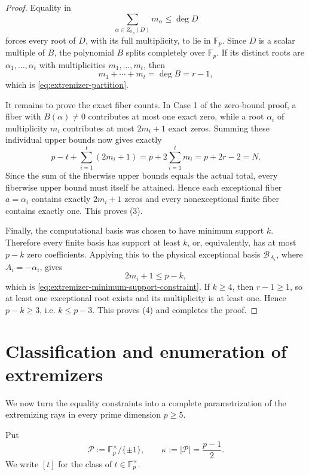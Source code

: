 \documentclass[11pt]{article}
\newcommand{\F}{\mathbb F}
\begin{document}
\begin{proof}
Equality in
\[
 \sum_{\alpha\in Z_{\F_p}(D)}m_\alpha\le\deg D
\]
forces every root of \(D\), with its full multiplicity, to lie in
\(\F_p\).  Since \(D\) is a scalar multiple of \(B\), the polynomial
\(B\) splits completely over \(\F_p\).  If its distinct roots are
\(\alpha_1,\ldots,\alpha_t\) with multiplicities
\(m_1,\ldots,m_t\), then
\[
 m_1+\cdots+m_t=\deg B=r-1,
\]
which is \eqref{eq:extremizer-partition}.

It remains to prove the exact fiber counts.  In Case 1 of the zero-bound
proof, a fiber with \(B(\alpha)\ne0\) contributes at most one exact
zero, while a root \(\alpha_i\) of multiplicity \(m_i\) contributes at
most \(2m_i+1\) exact zeros.  Summing these individual upper bounds now
gives exactly
\[
 p-t+\sum_{i=1}^t(2m_i+1)
 =p+2\sum_{i=1}^t m_i
 =p+2r-2
 =N.
\]
Since the sum of the fiberwise upper bounds equals the actual total,
every fiberwise upper bound must itself be attained.  Hence each
exceptional fiber \(a=\alpha_i\) contains exactly \(2m_i+1\) zeros and
every nonexceptional finite fiber contains exactly one.  This proves
(3).

Finally, the computational basis was chosen to have minimum support
\(k\).  Therefore every finite basis has support at least \(k\), or,
equivalently, has at most \(p-k\) zero coefficients.  Applying this to the physical exceptional basis
\(\mathcal B_{A_i}\), where \(A_i=-\alpha_i\), gives
\[
 2m_i+1\le p-k,
\]
which is \eqref{eq:extremizer-minimum-support-constraint}.  If
\(k\ge4\), then \(r-1\ge1\), so at least one exceptional root exists
and its multiplicity is at least one.  Hence \(p-k\ge3\), i.e.
\(k\le p-3\).  This proves (4) and completes the proof.
\end{proof}

\section{Classification and enumeration of extremizers}
\label{sec:complete-extremizers}

We now turn the equality constraints into a complete parametrization of the
extremizing rays in every prime dimension \(p\ge5\).

Put
\[
 \mathcal P:=\F_p^\times/\{\pm1\},
 \qquad
 \kappa:=|\mathcal P|=\frac{p-1}{2}.
\]
We write \([t]\) for the class of \(t\in\F_p^\times\).
\end{document}
